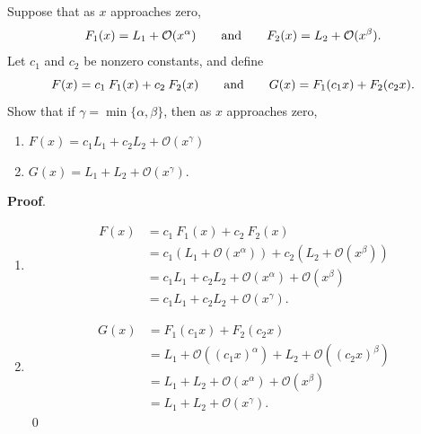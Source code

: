 \documentclass[11pt]{article}
\theoremstyle{break}
\numberwithin{equation}{theorem}
\begin{document}
\newpage
\begin{problem}\label{problem 11}
    Suppose that as $x$ approaches zero, \vspace{-0.6em}
    \begin{equation*}
        F_1(x)=L_1+\mathcal{O}(x^\alpha)\qquad\text{and}\qquad F_2(x)=L_2+\mathcal{O}(x^\beta). \vspace{-0.6em}
    \end{equation*}
    Let $c_1$ and $c_2$ be nonzero constants, and define \vspace{-0.6em}
    \begin{equation*}
        F(x)=c_1\:F_1(x)+c_2\:F_2(x)\qquad\text{and}\qquad G(x)=F_1(c_1x)+F_2(c_2x). \vspace{-0.6em}
    \end{equation*}
    Show that if $\gamma=\min\{\alpha, \beta\}$, then as $x$ approaches zero,
    \begin{enumerate}
        \item $F(x)=c_1L_1+c_2L_2+\mathcal{O}(x^\gamma)$
        \item $G(x)=L_1+L_2+\mathcal{O}(x^\gamma)$.
    \end{enumerate}
\end{problem}
\textbf{Proof}.
\begin{enumerate}
    \item \begin{align*}
        F(x)&=c_1\:F_1(x)+c_2\:F_2(x)\\
        &=c_1(L_1+\mathcal{O}(x^\alpha))+c_2(L_2+\mathcal{O}(x^\beta))\\
        &=c_1L_1+c_2L_2+\mathcal{O}(x^\alpha)+\mathcal{O}(x^\beta)\\
        &=c_1L_1+c_2L_2+\mathcal{O}(x^\gamma).
    \end{align*}
    \item \begin{align*}
        G(x)&=F_1(c_1x)+F_2(c_2x)\\
        &=L_1+\mathcal{O}((c_1x)^\alpha)+L_2+\mathcal{O}((c_2x)^\beta)\\
        &=L_1+L_2+\mathcal{O}(x^\alpha)+\mathcal{O}(x^\beta)\\
        &=L_1+L_2+\mathcal{O}(x^\gamma).
    \end{align*}\qed
\end{enumerate}
\end{document}
